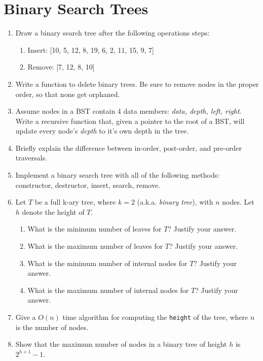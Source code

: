\documentclass[11pt]{article}
\begin{document}
\section{Binary Search Trees}
\begin{enumerate}
    \item Draw a binary search tree after the following operations steps:
    \begin{enumerate}
        \item Insert: [10, 5, 12, 8, 19, 6, 2, 11, 15, 9, 7]
        \item Remove: [7, 12, 8, 10]
    \end{enumerate}
    
    \item Write a function to delete binary trees. Be sure to remove nodes in the proper order, so that none get orphaned.

    \item Assume nodes in a BST contain 4 data members: {\it data, depth, left, right}.  Write a recursive function that, given a pointer to the root of a BST, will update every node's {\it depth} to it's own depth in the tree. 

    \item Briefly explain the difference between in-order, post-order, and pre-order traversals.

    \item Implement a binary search tree with all of the following methods: constructor, destructor, insert, search, remove.

    \item Let $T$ be a full k-ary tree, where $k=2$ (a.k.a. {\it binary tree}), with $n$ nodes.  Let $h$ denote the height of $T$.
    \begin{enumerate}
        \item What is the minimum number of leaves for $T$?  Justify your answer.
        \item What is the maximum number of leaves for $T$?  Justify your answer.
        \item What is the minimum number of internal nodes for $T$?  Justify your answer.
        \item What is the maximum number of internal nodes for $T$?  Justify your answer.
    \end{enumerate}

    \item Give a $O(n)$ time algorithm for computing the \verb|height| of the tree, where $n$ is the number of nodes.

    \item Show that the maximum number of nodes in a binary tree of height $h$ is $2^{h+1}-1$.
\end{enumerate}

\label{r:lastpage}
\end{document}

